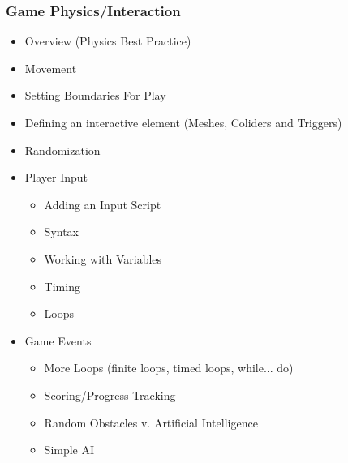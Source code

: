 \documentclass[letterpaper,10pt,english]{sphinxmanual}
\begin{document}
\subsubsection{Game Physics/Interaction}
\label{gamedev:game-physics-interaction}\begin{itemize}
\item {} 
Overview (Physics Best Practice)

\item {} 
Movement

\item {} 
Setting Boundaries For Play

\item {} 
Defining an interactive element (Meshes, Coliders and Triggers)

\item {} 
Randomization

\item {} 
Player Input
\begin{itemize}
\item {} 
Adding an Input Script

\item {} 
Syntax

\item {} 
Working with Variables

\item {} 
Timing

\item {} 
Loops

\end{itemize}

\item {} 
Game Events
\begin{itemize}
\item {} 
More Loops (finite loops, timed loops, while... do)

\item {} 
Scoring/Progress Tracking

\item {} 
Random Obstacles v. Artificial Intelligence

\item {} 
Simple AI

\end{itemize}

\end{itemize}
\end{document}
